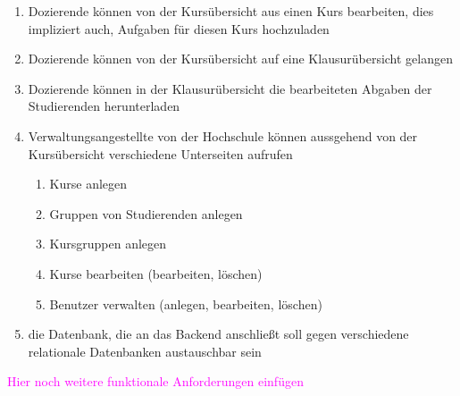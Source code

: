 \begin{enumerate}
	\item Dozierende können von der Kursübersicht aus einen Kurs bearbeiten, dies impliziert auch, Aufgaben für diesen Kurs hochzuladen
	\item Dozierende können von der Kursübersicht auf eine Klausurübersicht gelangen
	\item Dozierende können in der Klausurübersicht die bearbeiteten Abgaben der Studierenden herunterladen
	\item Verwaltungsangestellte von der Hochschule können aussgehend von der Kursübersicht verschiedene Unterseiten aufrufen
	\begin{enumerate}
		\item Kurse anlegen
	 	\item Gruppen von Studierenden anlegen
		\item Kursgruppen anlegen
		\item Kurse bearbeiten (bearbeiten, löschen)
		\item Benutzer verwalten (anlegen, bearbeiten, löschen)
	\end{enumerate}	 
	\item die Datenbank, die an das Backend anschließt soll gegen verschiedene relationale Datenbanken austauschbar sein
\end{enumerate}

\textcolor{magenta}{Hier noch weitere funktionale Anforderungen einfügen}